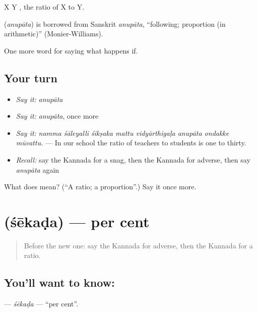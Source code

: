X  Y , the ratio of X to Y.

\begin{cousinweb}
\textbf{} (\emph{anupāta}) is borrowed from Sanskrit \emph{anupāta}, \textquotedblleft{}following; proportion (in arithmetic)\textquotedblright{} (Monier-Williams).
\end{cousinweb}

\begin{grammarlens}[title={What you've built}]
One more word for saying what happens if.
\end{grammarlens}

\subsection*{Your turn}
\begin{itemize}
\raggedright
  \item \emph{Say it:} \emph{anupāta}
  \item \emph{Say it:} \emph{anupāta}, once more
  \item \emph{Say it:} \emph{namma śāleyalli śikṣaka mattu vidyārthigaḷa anupāta ondakke mūvattu.} — In our school the ratio of teachers to students is one to thirty.
  \item \emph{Recall:} say the Kannada for a snag, then the Kannada for adverse, then say \emph{anupāta} again
\end{itemize}

\begin{tcolorbox}[breakable,colback=teal!4,colframe=teal!35!black,title={Before you move on}]
What does  mean? (\textquotedblleft{}A ratio; a proportion\textquotedblright{}.) Say it once more.
\end{tcolorbox}
\section[\texorpdfstring{\kn{ಶೇಕಡ} (śēkaḍa)}{ಶೇಕಡ (śēkaḍa)}]{ (śēkaḍa) — per cent}

\label{lesson:KA-C427-sekada}



\begin{quote}
Before the new one: say the Kannada for adverse, then the Kannada for a ratio.
\end{quote}

\subsection*{You'll want to know: }
\textbf{} — \emph{śēkaḍa} — \textquotedblleft{}per cent\textquotedblright{}.

